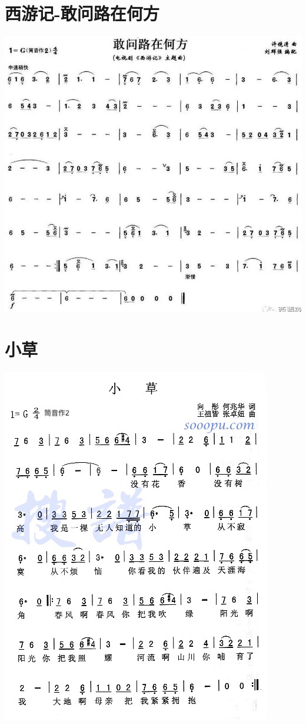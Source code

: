 \documentclass[cn,pad,twocol]{elegantbook}
\begin{document}
\section{西游记-敢问路在何方}   \includegraphics[width=\textwidth]{dongxiao/20200819/西游记-敢问路在何方.jpeg}
\section{小草}                  \includegraphics[width=\textwidth]{dongxiao/20200627-小草.jpg}  
\end{document}
